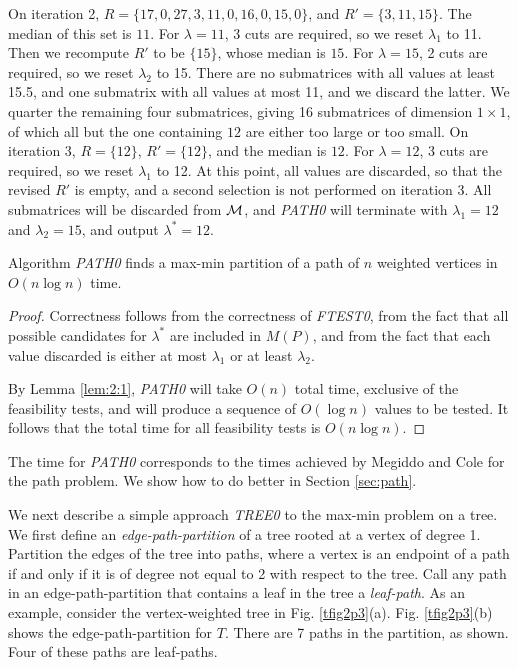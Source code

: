 On iteration 2, $R= \{17,0,27,3,11,0,16,0,15,0\}$, and $R'= \{3,11,15\}$.
The median of this set is $11$.
For $\lambda = 11$, 3 cuts are required, so we reset $\lambda_1$ to 11.
Then we recompute $R'$ to be $\{15\}$, whose median is $15$.
For $\lambda = 15$, 2 cuts are required, so we reset $\lambda_2$ to 15.
There are no submatrices with all values at least 15.5, and one submatrix with all values at most 11, and we discard the latter.
We quarter the remaining four submatrices, giving 16 submatrices of dimension $1 \times 1$, of which all but the one containing $12$ are either too large or too small.
On iteration 3, $R=\{12\}$, $R'=\{12\}$, and the median is $12$.
For $\lambda = 12$, 3 cuts are required, so we reset $\lambda_1$ to 12.
At this point, all values are discarded, so that the revised $R'$ is empty, and a second selection is not performed on iteration 3.
All submatrices will be discarded from $\cal M$, and {\it PATH0} will terminate with $\lambda_1 = 12$ and $\lambda_2 = 15$, and output $\lambda^*=12$.
\bigskip

\begin{theorem}
\label{thm:2:2}
Algorithm {\it PATH0} finds a max-min partition of a path of $n$
weighted vertices in $O(n \log n)$ time.
\end{theorem}
\begin{proof}
Correctness follows from the correctness of {\it FTEST0}, from the fact that all possible candidates for $\lambda^*$ are included in $M(P)$, and from the fact that each value discarded is either at most $\lambda_1$ or at least $\lambda_2$.

By Lemma \ref{lem:2:1}, {\it PATH0} will take $O(n)$ total time, exclusive of the feasibility tests, and will produce a sequence of $O( \log n )$ values to be tested.
It follows that the total time for all feasibility tests is $O(n \log n)$.
\end{proof}

The time for {\it PATH0} corresponds to the times achieved by Megiddo and Cole
for the path problem.
We show how to do better in Section \ref{sec:path}.

We next describe a simple approach {\it TREE0} to the max-min problem on a tree.
We first define an {\it edge-path-partition} of a tree
rooted at a vertex of degree 1.
Partition the edges of the tree into paths,
where a vertex is an endpoint of a path
if and only if it is of degree not equal to 2 with respect to the tree.
Call any path in an edge-path-partition
that contains a leaf in the tree a {\it leaf-path}.
As an example, consider the vertex-weighted tree in Fig. \ref{tfig2p3}(a).
Fig. \ref{tfig2p3}(b) shows the edge-path-partition for $T$.
There are 7 paths in the partition, as shown.
Four of these paths are leaf-paths.

